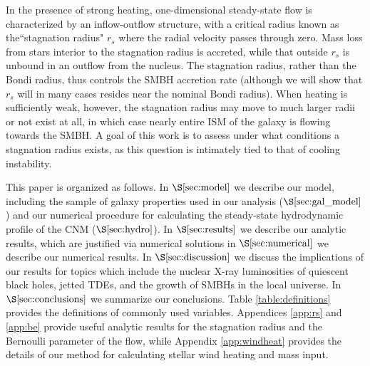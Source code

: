 \documentclass[usenatbib,fleqn]{mn2e}
\newcommand{\rs}{r_s}
\begin{document}
In the presence of strong heating, one-dimensional steady-state flow
is characterized by an inflow-outflow structure, with a critical
radius known as the``stagnation radius" $\rs$ where the radial
velocity passes through zero.  Mass loss from stars interior to the
stagnation radius is accreted, while that outside $\rs$ is unbound in
an outflow from the nucleus.  The stagnation radius, rather than the
Bondi radius, thus controls the SMBH accretion rate (although we will
show that $\rs$ will in many cases resides near the nominal Bondi
radius).  When heating is sufficiently weak, however, the stagnation
radius may move to much larger radii or not exist at all, in which
case nearly entire ISM of the galaxy is flowing towards the SMBH.  A goal
of this work is to assess under what conditions a stagnation radius
exists, as this question is intimately tied to that of cooling
instability.



This paper is organized as follows.  In $\S\ref{sec:model}$ we
describe our model, including the sample of galaxy properties used in
our analysis ($\S\ref{sec:gal_model}$) and our numerical procedure for
calculating the steady-state hydrodynamic profile of the CNM
($\S\ref{sec:hydro}$).  In $\S\ref{sec:results}$ we describe our
analytic results, which are justified via numerical solutions in
$\S\ref{sec:numerical}$ we describe our numerical results.  In
$\S\ref{sec:discussion}$ we discuss the implications of our results
for topics which include the nuclear X-ray luminosities of quiescent
black holes, jetted TDEs, and the growth of SMBHs in the local
universe.  In $\S\ref{sec:conclusions}$ we summarize our conclusions.
Table \ref{table:definitions} provides the definitions of commonly
used variables.  Appendices \ref{app:rs} and \ref{app:be} provide
useful analytic results for the stagnation radius and the Bernoulli
parameter of the flow, while Appendix \ref{app:windheat} provides the
details of our method for calculating stellar wind heating and mass
input.
\end{document}
